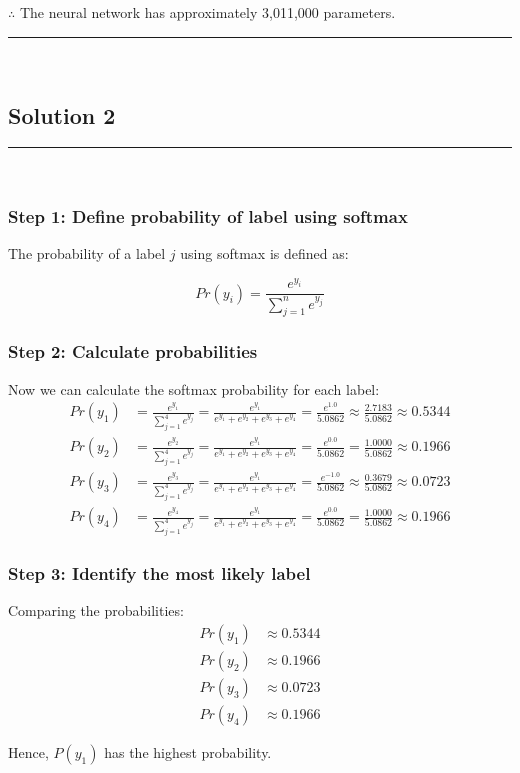 \documentclass{article}
\begin{document}
\subsubsection*{\normalfont}{$\therefore$ The neural network has approximately 3,011,000 parameters.}

\noindent\rule{\textwidth}{0.4pt}\\

\newpage

\subsection*{Solution 2}
\noindent\rule{\textwidth}{0.4pt}\\

\subsubsection*{Step 1: Define probability of label using softmax}
\parbox{\textwidth}{
The probability of a label $j$ using softmax is defined as:

$$Pr(y_i) = \frac{e^{y_i}}{\sum_{j=1}^{n} e^{y_j}}$$

}

\subsubsection*{Step 2: Calculate probabilities}
\parbox{\textwidth}{
Now we can calculate the softmax probability for each label:
\begin{align*}
Pr(y_1) &= \frac{e^{y_1}}{\sum_{j=1}^{4} e^{y_j}} = \frac{e^{y_1}}{e^{y_1}+e^{y_2}+e^{y_3}+e^{y_4}} = \frac{e^{1.0}}{5.0862} \approx \frac{2.7183}{5.0862} \approx 0.5344\\
Pr(y_2) &= \frac{e^{y_2}}{\sum_{j=1}^{4} e^{y_j}} = \frac{e^{y_1}}{e^{y_1}+e^{y_2}+e^{y_3}+e^{y_4}} = \frac{e^{0.0}}{5.0862} = \frac{1.0000}{5.0862} \approx 0.1966\\
Pr(y_3) &= \frac{e^{y_3}}{\sum_{j=1}^{4} e^{y_j}} = \frac{e^{y_1}}{e^{y_1}+e^{y_2}+e^{y_3}+e^{y_4}} = \frac{e^{-1.0}}{5.0862} \approx \frac{0.3679}{5.0862} \approx 0.0723\\
Pr(y_4) &= \frac{e^{y_4}}{\sum_{j=1}^{4} e^{y_j}} = \frac{e^{y_1}}{e^{y_1}+e^{y_2}+e^{y_3}+e^{y_4}} = \frac{e^{0.0}}{5.0862} = \frac{1.0000}{5.0862} \approx 0.1966
\end{align*}
}

\subsubsection*{Step 3: Identify the most likely label}
\parbox{\textwidth}{
Comparing the probabilities:
\begin{align*}
Pr(y_1) &\approx 0.5344\\
Pr(y_2) &\approx 0.1966\\
Pr(y_3) &\approx 0.0723\\
Pr(y_4) &\approx 0.1966
\end{align*}

Hence, $P(y_1)$ has the highest probability.
}
\end{document}
